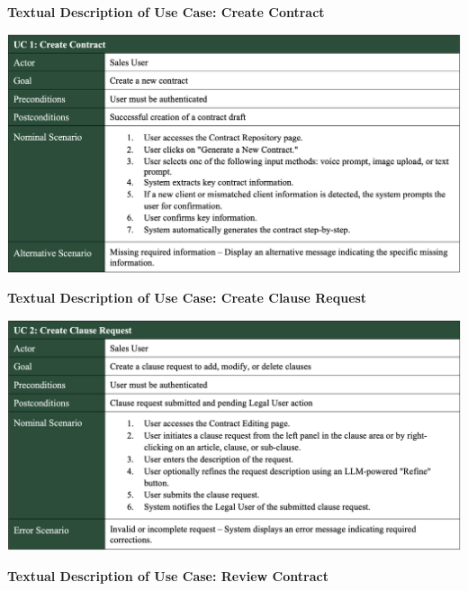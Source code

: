 \textbf{Textual Description of Use Case: Create Contract}\vspace{-0.3cm}

\begin{center}
    \centering
    \includegraphics[width=1\textwidth]{Images/Create Contract Use Case.png}
    \label{tab:create_contract_use_case}
\end{center}

\vspace{0.3cm}

\textbf{Textual Description of Use Case: Create Clause Request}\vspace{-0.3cm}

\begin{center}
    \centering
    \includegraphics[width=1\textwidth]{Images/Create Clause Request Use Case.png}
    \label{tab:create_clause_request_use_case}
\end{center}

\vspace{0.3cm}
\newpage

\textbf{Textual Description of Use Case: Review Contract}\vspace{-0.3cm}

